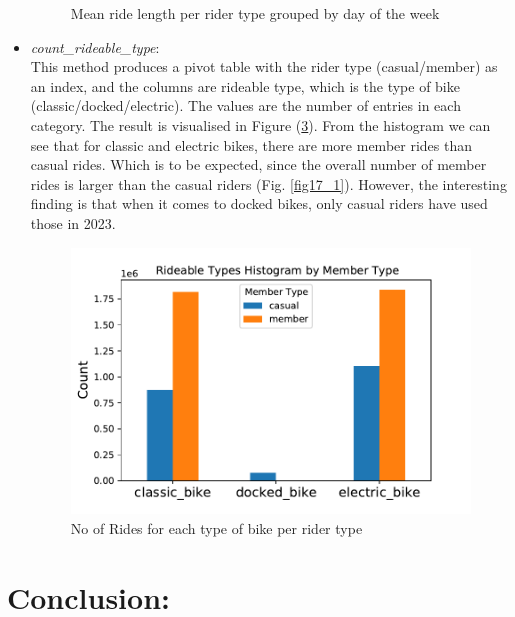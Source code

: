 \documentclass[12pt]{article}
\begin{document}
\begin{itemize}
\begin{figure}[h]
\begin{subfigure}{.55\textwidth}
		\caption{}
		\label{fig14_2}
	\end{subfigure}
	\caption{Mean ride length per rider type grouped by day of the week}
	\label{fig14}
	\end{figure}
	\pagebreak

	\item \textit{count\_rideable\_type}:\\
	This method produces a pivot table with the rider type (casual/member) as an index, and the columns are rideable type, which is the type of bike (classic/docked/electric). The values are the number of entries in each category. The result is visualised in Figure (\ref{fig16}). From the histogram we can see that for classic and electric bikes, there are more member rides than casual rides. Which is to be expected, since the overall number of member rides is larger than the casual riders (Fig. \ref{fig17_1}). However, the interesting finding is that when it comes to docked bikes, only casual riders have used those in 2023.
	
	\begin{figure}[h]
	\centering
	\includegraphics[scale=0.6]{rideable_types.pdf} 
	\caption{No of Rides for each type of bike per rider type}
	\label{fig16}
	\end{figure}
	
\end{itemize}

\pagebreak

\section*{Conclusion:}
\end{document}
